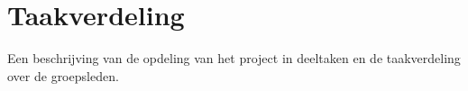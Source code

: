 
\chapter{Taakverdeling}

Een beschrijving van de opdeling van het project in deeltaken en de
taakverdeling over de groepsleden.

